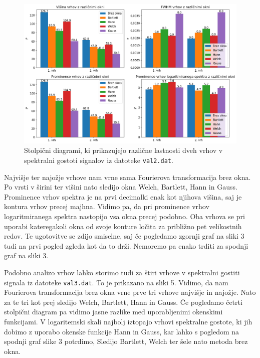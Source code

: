 \documentclass[slovene,11pt,a4paper]{article}
\begin{document}
\begin{figure}[h!]
\centering
\includegraphics[width=15cm]{slika4.png}
\caption{Stolpični diagrami, ki prikazujejo različne lastnosti dveh vrhov v spektralni gostoti signalov iz datoteke \texttt{val2.dat}.}
\end{figure}

Najvišje ter najožje vrhove nam vrne sama Fourierova transformacija brez okna. Po vrsti v širini ter višini nato sledijo okna Welch, Bartlett, Hann in Gauss. Prominence vrhov spektra je na prvi decimalki enak kot njihova višina, saj je kontura vrhov precej majhna. Vidimo pa, da pri prominence vrhov logaritmiranega spektra nastopijo vsa okna precej podobno. Oba vrhova se pri uporabi kateregakoli okna od svoje konture ločita za približno pet velikostnih redov. Te ugotovitve se zdijo smiselne, saj če pogledamo zgornji graf na sliki 3 tudi na prvi pogled zgleda kot da to drži. Nemoremo pa enako trditi za  spodnji graf na sliki 3.

Podobno analizo vrhov lahko storimo tudi za štiri vrhove v spektralni gostiti signala iz datoteke \texttt{val3.dat}. To je prikazano na sliki 5. Vidimo, da nam Fourierova transformacija brez okna vrne prve tri vrhove najvišje in najožje. Nato za te tri kot prej sledijo Welch, Bartlett, Hann in Gauss. Če pogledamo četrti stolpični diagram pa vidimo jasne razlike med uporabljenimi okenskimi funkcijami. V logaritemski skali najbolj iztopajo vrhovi spektralne gostote, ki jih dobimo z uporabo okenske funkcije Hann in Gauss, kar lahko s pogledom na spodnji graf slike 3 potrdimo, Sledijo Bartlett, Welch ter šele nato metoda brez okna.
\end{document}
